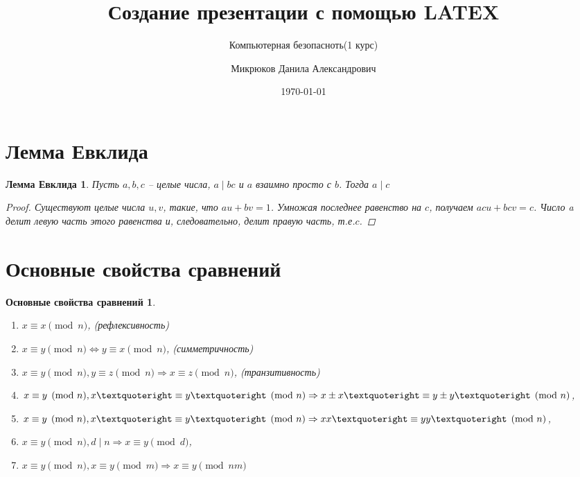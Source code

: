 \documentclass[handout]{beamer}
\title{Создание презентации с помощью LATEX}
\subtitle{Компьютерная безопасноть(1 курс)}
\author{Микрюков Данила Александрович}
\institute{Балтийский Федеральный Университет}
\date{\today}
\newtheorem*{mylem}{Лемма Евклида}
\newtheorem*{predl}{Основные свойства сравнений}
\begin{document}
\begin{frame}
\titlepage
\end{frame}

\section{Лемма Евклида}
\begin{frame}
\begin{mylem}
	Пусть $a, b, c$ -- целые числа, $a\mid bc$ и $a$ взаимно просто с $b$. Тогда $a\mid c$
	\begin{proof}
	Существуют целые числа $u, v$, такие, что $au + bv = 1$. Умножая последнее равенство на $c$, получаем $acu + bcv = c$. Число a делит левую часть этого равенства и, следовательно, делит правую часть, т.е.$c$. 
	\end{proof}
\end{mylem}
\end{frame}
\section{Основные свойства сравнений}

\begin{frame}
\begin{predl}
	\begin{enumerate}
		\item $x \equiv x \pmod n$, (рефлексивность)
		\item $x \equiv  y \pmod n \Leftrightarrow  y \equiv  x \pmod n$, (симметричность)
		\item $x \equiv y \pmod n, y \equiv z \pmod n \Rightarrow x \equiv  z \pmod n$, (транзитивность)
		\item $x \equiv  y \pmod n, x\textquoteright \equiv  y\textquoteright \pmod n \Rightarrow x \pm x\textquoteright \equiv  y \pm y\textquoteright \pmod n$,
		\item $x \equiv  y \pmod n, x\textquoteright \equiv  y\textquoteright \pmod n \Rightarrow xx\textquoteright \equiv  yy\textquoteright \pmod n$,
		\item $x \equiv  y \pmod n, d\mid n \Rightarrow x \equiv  y \pmod d$,
		\item $x \equiv  y \pmod n, x \equiv  y \pmod m \Rightarrow x \equiv  y \pmod {nm}$
	\end{enumerate}
	 
\end{predl}	
\end{frame}
\end{document}
